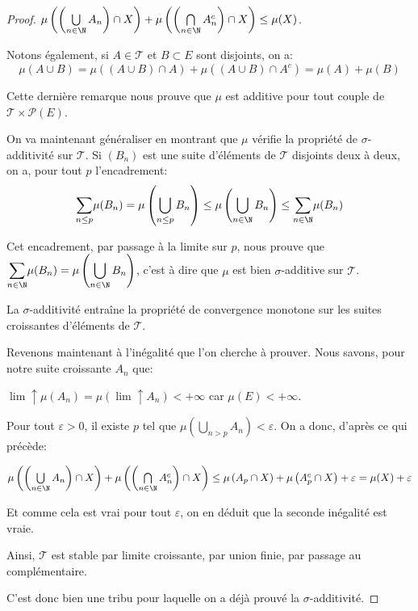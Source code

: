 \begin{proof}
$\mu\left(\left(\bigcup \limits_{n \in \N} A_n\right) \cap X\right) + \mu\left(\left(\bigcap \limits_{n \in \N} A_n^c\right) \cap X\right) \leq \mu(X)$. 

Notons également, si $A \in \mathcal{T}$ et $B \subset E$ sont disjoints, on a:
\[
\mu(A \cup B) = \mu\left((A \cup B) \cap A\right)  + \mu\left((A \cup B) \cap A^c\right) = \mu(A)+\mu(B)
\]

Cette dernière remarque nous prouve que $\mu$ est additive pour tout couple de $\mathcal{T} \times \mathcal{P}(E)$.

On va maintenant généraliser en montrant que $\mu$ vérifie la propriété de $\sigma$-additivité sur $\mathcal{T}$. Si $(B_n)$ est une suite d'éléments de $\mathcal{T}$ disjoints deux à deux, on a, pour tout $p$ l'encadrement:
\[
\displaystyle{\sum \limits_{n \leq p}} \mu(B_n)  = \mu \left ( \bigcup \limits_{n \leq p} B_n \right )\leq \mu\left(\bigcup \limits_{n \in \N} B_n\right) \leq 
\displaystyle{\sum \limits_{n \in \N}} \mu(B_n)
\]

Cet encadrement, par passage à la limite sur $p$, nous prouve que $\displaystyle{\sum \limits_{n \in \N}} \mu(B_n) = \mu\left(\bigcup \limits_{n \in \N} B_n\right)$, c'est à dire que $\mu$ est bien $\sigma$-additive sur $\mathcal{T}$.

La $\sigma$-additivité entraîne la propriété de convergence monotone sur les suites croissantes d'éléments de $\mathcal{T}$.

Revenons maintenant à l'inégalité que l'on cherche à prouver. Nous savons, pour notre suite croissante $A_n$ que:

$\lim \uparrow \mu\left( A_n \right) = \mu\left(\lim \uparrow A_n \right) < +\infty$ car $\mu(E)<+\infty$.

Pour tout $\varepsilon > 0$, il existe  $p$ tel que $\mu\left(\bigcup \limits_{n >p} A_n\right) < \varepsilon$. On a donc, d'après ce qui précède:

$
\mu\left(\left(\bigcup \limits_{n \in \N} A_n\right) \cap X\right) + \mu\left(\left(\bigcap \limits_{n \in \N} A_n^c\right) \cap X\right) \leq \mu\left(A_p \cap X\right) + \mu\left(A_p^c \cap X\right) + \varepsilon = \mu(X) +\varepsilon 
$



Et comme cela est vrai pour tout $\varepsilon$, on en déduit que la seconde inégalité est vraie.

Ainsi, $\mathcal{T}$ est stable par limite croissante, par union finie, par passage au complémentaire.

C'est donc bien une tribu pour laquelle on a déjà prouvé la $\sigma$-additivité.
\end{proof}

